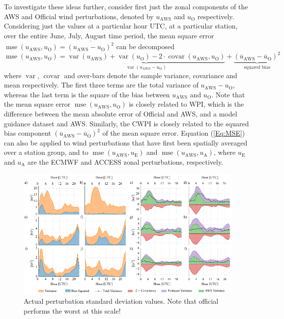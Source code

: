 \documentclass{ametsoc}
\DeclareMathOperator{\mse}{mse}
\DeclareMathOperator{\covar}{covar}
\DeclareMathOperator{\var}{var}
\begin{document}
To investigate these ideas further, consider first just the zonal components of the AWS and Official wind perturbations, denoted by $u_\text{AWS}$ and $u_\text{O}$ respectively. Considering just the values at a particular hour UTC, at a particular station, over the entire June, July, August time period, the mean square error  $\mse\left(u_\text{AWS}, u_\text{O}\right) = \overline{\left(u_\text{AWS} - u_\text{O}\right)^2}$ can be decomposed
\begin{equation}
\mse\left(u_\text{AWS}, u_\text{O}\right) = \underbrace{\var\left(u_\text{AWS}\right) + \var\left(u_\text{O}\right) - 2 \cdot \covar\left(u_\text{AWS}, u_\text{O}\right)}_{\var\left(u_\text{AWS} - u_\text{O}\right)} + \underbrace{\left(\overline{u}_\text{AWS} - \overline{u}_\text{O}\right)^2}_{\text{squared bias}} \label{Eq:MSE}
\end{equation}
where $\var$, $\covar$ and over-bars denote the sample variance, covariance and mean respectively. The first three terms are the total variance of $u_\text{AWS} - u_\text{O}$, whereas the last term is the square of the bias between $u_\text{AWS}$ and $u_\text{O}$. Note that the mean square error $\mse\left(u_\text{AWS}, u_\text{O}\right)$ is closely related to $\overline{\text{WPI}}$, which is the difference between the mean absolute error of Official and AWS, and a model guidance dataset and AWS. Similarly, the CWPI is closely related to the squared bias component $\left(\overline{u}_\text{AWS} - \overline{u}_\text{O}\right)^2$ of the mean square error. Equation (\ref{Eq:MSE}) can also be applied to wind perturbations that have first been spatially averaged over a station group, and to $\mse\left(u_\text{AWS}, u_\text{E}\right)$ and $\mse\left(u_\text{AWS}, u_\text{A}\right)$, where $u_\text{E}$ and $u_\text{A}$ are the ECMWF and ACCESS zonal perturbations, respectively. 

\begin{figure}
\centering
\includegraphics[width=39pc]{error_decomp.pdf}
\caption{Actual perturbation standard deviation values. Note that official performs the worst at this scale!}
\label{Fig:error_decomp}
\end{figure}
\end{document}
